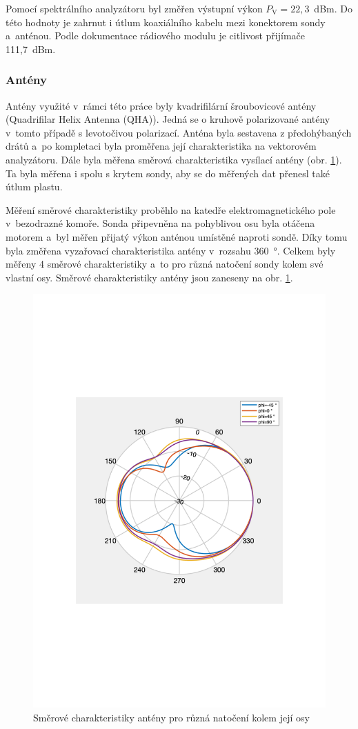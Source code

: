 \documentclass[twoside]{ctuthesis}
\newcommand{\mt}[1]{\text{#1}}
\theoremstyle{plain}
\theoremstyle{definition}
\theoremstyle{note}
\begin{document}
			Pomocí spektrálního analyzátoru byl změřen výstupní výkon $P_\mt{V} = 22{,}3$~dBm. Do této hodnoty je zahrnut i útlum koaxiálního kabelu mezi konektorem sondy a~anténou. Podle dokumentace rádiového modulu \cite{telit} je citlivost přijímače 111{,}7~dBm.

			\subsubsection{Antény}
			\label{sec:anteny}
			Antény využité v~rámci této práce byly kvadrifilární šroubovicové antény (Quadrifilar Helix Antenna (QHA)). Jedná se o kruhově polarizované antény v~tomto případě s levotočivou polarizací. Anténa byla sestavena z předohýbaných drátů a~po kompletaci byla proměřena její charakteristika na vektorovém analyzátoru. Dále byla měřena směrová charakteristika vysílací antény (obr. \ref{graph:radiation:char}). Ta byla měřena i spolu s krytem sondy, aby se do měřených dat přenesl také útlum plastu. 

			Měření směrové charakteristiky proběhlo na katedře elektromagnetického pole v~bezodrazné komoře. Sonda připevněna na pohyblivou osu byla otáčena motorem a~byl měřen přijatý výkon anténou umístěné naproti sondě. Díky tomu byla změřena vyzařovací charakteristika antény v~rozsahu 360~°. Celkem byly měřeny 4 směrové charakteristiky a~to pro různá natočení sondy kolem své vlastní osy. Směrové charakteristiky antény jsou zaneseny na obr. \ref{graph:radiation:char}.

			\begin{figure}[hbtp]
				\centering
				\includegraphics[width=.5\textwidth]{Graphs/radiation_plot.pdf}
				\caption{Směrové charakteristiky antény pro různá natočení kolem její osy}
				\label{graph:radiation:char}
			\end{figure}
\end{document}

